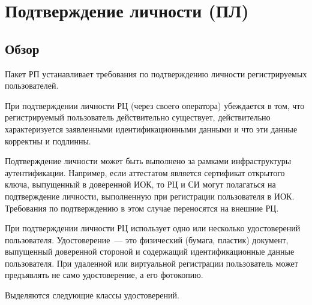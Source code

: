 \section{Подтверждение личности (ПЛ)}\label{IP}

\subsection{Обзор}\label{IP.Intro}

Пакет РП устанавливает требования по подтверждению личности регистрируемых 
пользователей.

При подтверждении личности РЦ (через своего оператора) убеждается 
в том, что регистрируемый пользователь действительно существует, 
действительно характеризуется заявленными идентификационными данными
и что эти данные корректны и подлинны.
%

Подтверждение личности может быть выполнено за рамками инфраструктуры
аутентификации. Например, если аттестатом является сертификат открытого ключа, 
выпущенный в доверенной ИОК, то РЦ и СИ могут полагаться на подтверждение 
личности, выполненную при регистрации пользователя в ИОК.
%
Требования по подтверждению в этом случае переносятся на внешние РЦ.

При подтверждении личности РЦ использует одно или несколько удостоверений
пользователя.  
%
Удостоверение~--- это физический (бумага, пластик) документ, выпущенный 
доверенной стороной и содержащий идентификационные данные 
пользователя.
%
%
При удаленной или виртуальной регистрации пользователь может 
предъявлять не само удостоверение, а его фотокопию.

Выделяются следующие классы удостоверений.

